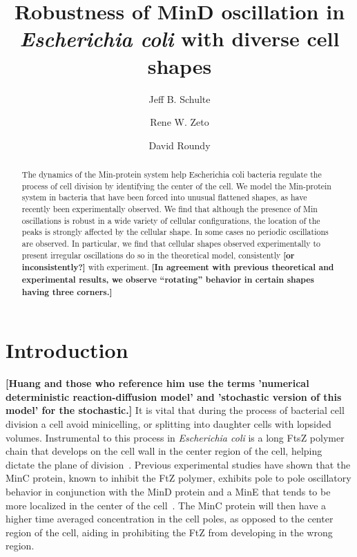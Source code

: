 \documentclass[letterpaper,twocolumn,amsmath,amssymb,pre]{revtex4-1}
\newcommand{\red}[1]{{\bf \color{red} #1}}
\newcommand{\fixme}[1]{\red{[#1]}}
\begin{document}
\title{Robustness of MinD oscillation in \emph{Escherichia coli} with
  diverse cell shapes}

\author{Jeff B. Schulte}
\author{Rene W. Zeto}
\author{David Roundy}

\begin{abstract}
  The dynamics of the Min-protein system help Escherichia coli
  bacteria regulate the process of cell division by identifying the
  center of the cell.  We model the Min-protein system in bacteria
  that have been forced into unusual flattened shapes, as have
  recently been experimentally observed.  We find that although the
  presence of Min oscillations is robust in a wide variety of cellular
  configurations, the location of the peaks is strongly affected by
  the cellular shape.  In some cases no periodic oscillations are
  observed.  In particular, we find that cellular shapes observed
  experimentally to present irregular oscillations do so in the
  theoretical model, consistently \fixme{or inconsistently?} with
  experiment.  \fixme{In agreement with previous theoretical and
    experimental results, we observe ``rotating'' behavior in certain
    shapes having three corners.}
\end{abstract}

\maketitle

\section{Introduction}
\fixme{Huang and those who reference him use the terms 'numerical
  deterministic reaction-diffusion model' and 'stochastic version of
  this model' for the stochastic.} It is vital that during the process
of bacterial cell division a cell avoid minicelling, or splitting into
daughter cells with lopsided volumes.  Instrumental to this process in
\emph{Escherichia coli} is a long FtsZ polymer chain that develops on
the cell wall in the center region of the cell, helping dictate the
plane of division~\cite{adams2009bacterial,
  lutkenhaus2007assembly}. Previous experimental studies have shown
that the MinC protein, known to inhibit the FtZ
polymer\cite{shen2010examination}, exhibits pole to pole oscillatory
behavior in conjunction with the MinD protein and a MinE that tends to
be more localized in the center of the cell~\cite{hu1999topological,
  fu2001mine, shapiro2009and, yu1999ftsz, raskin1999rapid}. The MinC
protein will then have a higher time averaged concentration in the
cell poles, as opposed to the center region of the cell, aiding in
prohibiting the FtZ from developing in the wrong region.
\end{document}
